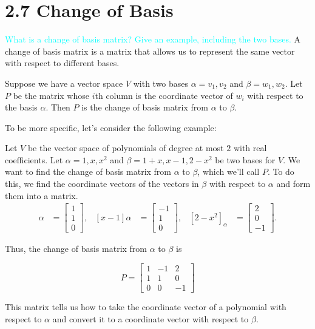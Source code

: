 \documentclass[fontsize=12pt]{scrartcl}
\begin{document}
\section{2.7 Change of Basis}

\bigskip

\noindent
\textcolor{cyan}{What is a change of basis matrix? Give an example, including the two bases.}
\noindent
A change of basis matrix is a matrix that allows us to represent the same vector with respect to different bases.

\noindent
Suppose we have a vector space $V$ with two bases $\alpha = {v_1, v_2}$ and $\beta = {w_1, w_2}$. Let $P$ be the matrix whose $i$th column is the coordinate vector of $w_i$ with respect to the basis $\alpha$. Then $P$ is the change of basis matrix from $\alpha$ to $\beta$.

\noindent
To be more specific, let's consider the following example:

\noindent
Let $V$ be the vector space of polynomials of degree at most $2$ with real coefficients. Let $\alpha = {1, x, x^2}$ and $\beta = {1 + x, x - 1, 2 - x^2}$ be two bases for $V$. We want to find the change of basis matrix from $\alpha$ to $\beta$, which we'll call $P$. To do this, we find the coordinate vectors of the vectors in $\beta$ with respect to $\alpha$ and form them into a matrix.
\begin{align*}
[1 + x]{\alpha} &= \begin{bmatrix}1 \\ 1 \\ 0\end{bmatrix}, &
[x - 1]{\alpha} &= \begin{bmatrix}-1 \\ 1 \\ 0\end{bmatrix}, &
[2 - x^2]_{\alpha} &= \begin{bmatrix}2 \\ 0 \\ -1\end{bmatrix}.
\end{align*}

Thus, the change of basis matrix from $\alpha$ to $\beta$ is

$$P = \begin{bmatrix}1 & -1 & 2 \\ 1 & 1 & 0 \\ 0 & 0 & -1\end{bmatrix} $$

\noindent
This matrix tells us how to take the coordinate vector of a polynomial with respect to $\alpha$ and convert it to a coordinate vector with respect to $\beta$.
\\
\end{document}
